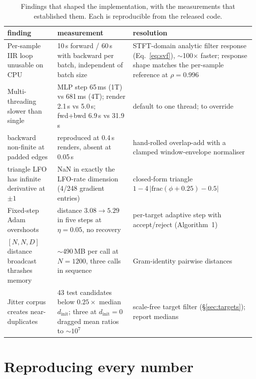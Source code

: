\documentclass[11pt]{article}
\newcommand{\code}[1]{\texttt{\detokenize{#1}}}
\newcommand{\nDrop}{43}
\begin{document}
\begin{table}[h]
\centering
\small
\caption{Findings that shaped the implementation, with the measurements that
established them. Each is reproducible from the released code.}
\begin{tabular}{p{4.0cm}p{4.5cm}p{5.3cm}}
\toprule
finding & measurement & resolution \\
\midrule
Per-sample IIR loop unusable on CPU & 10\,s forward / 60\,s with backward per
batch, independent of batch size & STFT-domain analytic filter response
(Eq.~\eqref{eq:svf}), $\sim$100$\times$ faster; response shape matches the
per-sample reference at $\rho = 0.996$ \\
Multi-threading slower than single & MLP step 65\,ms (1T) vs 681\,ms (4T);
render 2.1\,s vs 5.0\,s; fwd+bwd 6.9\,s vs 31.9\,s & default to one thread;
\code{STAGE0_THREADS} to override \\
\code{torch.istft} backward non-finite at padded edges & reproduced at 0.4\,s
renders, absent at 0.05\,s & hand-rolled overlap-add with a clamped
window-envelope normaliser \\
\code{asin(sin(x))} triangle LFO has infinite derivative at $\pm1$ & NaN in
exactly the LFO-rate dimension (4/248 gradient entries) & closed-form triangle
$1-4\,|\mathrm{frac}(\phi+0.25)-0.5|$ \\
Fixed-step Adam overshoots & distance $3.08 \rightarrow 5.29$ in five steps at
$\eta = 0.05$, no recovery & per-target adaptive step with accept/reject
(Algorithm~1) \\
$[N,N,D]$ distance broadcast thrashes memory & $\sim$490\,MB per call at
$N = 1200$, three calls in sequence & Gram-identity pairwise distances \\
Jitter corpus creates near-duplicates & \nDrop{} test candidates below
$0.25\times$ median $d_{\text{init}}$; three at $d_{\text{init}} = 0$ dragged
mean ratios to $\sim10^{7}$ & scale-free target filter
(\S\ref{sec:targets}); report medians \\
\bottomrule
\end{tabular}
\end{table}

\section{Reproducing every number}\label{app:repro}
\end{document}
